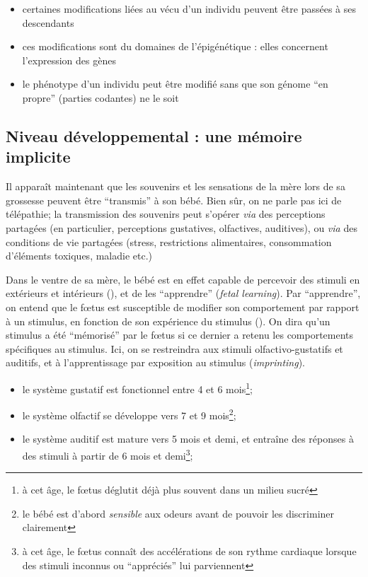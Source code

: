 \documentclass[french]{article}
\begin{document}
		
		\begin{itemize}
			\item certaines modifications liées au vécu d'un individu peuvent être passées à ses descendants
			\item ces modifications sont du domaines de l'épigénétique : elles concernent l'expression des gènes
			\item le phénotype d'un individu peut être modifié sans que son génome ``en propre'' (parties codantes) ne le soit
		\end{itemize}
		\subsection{Niveau développemental : une mémoire implicite}
			Il apparaît maintenant que les souvenirs et les sensations de la mère lors de sa grossesse peuvent être ``transmis'' à son bébé. Bien sûr, on ne parle pas ici de télépathie; la transmission des souvenirs peut s'opérer \textit{via} des perceptions partagées (en particulier, perceptions gustatives, olfactives, auditives), ou \textit{via} des conditions de vie partagées (stress, restrictions alimentaires, consommation d'éléments toxiques, maladie etc.)
			
				Dans le ventre de sa mère, le bébé est en effet capable de percevoir des stimuli en extérieurs et intérieurs (\cite{busnel2010}), et de les ``apprendre'' (\textit{fetal learning}). Par ``apprendre'', on entend que le fœtus est susceptible de modifier son comportement par rapport à un stimulus, en fonction de son expérience du stimulus (\cite{james2010}). On dira qu'un stimulus a été ``mémorisé'' par le fœtus si ce dernier a retenu  les comportements spécifiques au stimulus.  Ici, on se restreindra aux stimuli olfactivo-gustatifs et auditifs, et à l'apprentissage par exposition au stimulus (\textit{imprinting}).
				\begin{itemize}
					\item le système gustatif est fonctionnel entre 4 et 6 mois\footnote{à cet âge, le fœtus déglutit déjà plus souvent dans un milieu sucré};
					\item le système olfactif se développe vers 7 et 9 mois\footnote{le bébé est d'abord \textit{sensible} aux odeurs avant de pouvoir les discriminer clairement};
					\item le système auditif est mature vers 5 mois et demi, et entraîne des réponses à des stimuli à partir de 6 mois et demi\footnote{à cet âge, le fœtus connaît des accélérations de son rythme cardiaque lorsque des stimuli inconnus ou ``appréciés'' lui parviennent};
				\end{itemize}
			
\end{document}
